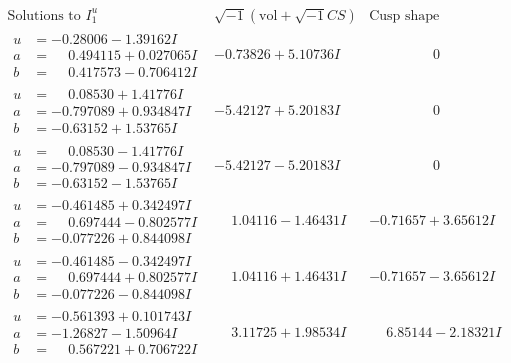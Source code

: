 \documentclass[1p]{elsarticle_modified}
\theoremstyle{definition}
\newcommand{\I}{\sqrt{-1}}
\begin{document}
$$\begin{array}{c|c|c}
 \end{array}$$\newpage$$\begin{array}{c|c|c}  
\text{Solutions to }I^u_{1}& \I (\text{vol} + \sqrt{-1}CS) & \text{Cusp shape}\\
 \hline 
\begin{aligned}
u &= -0.28006 - 1.39162 I \\
a &= \phantom{-}0.494115 + 0.027065 I \\
b &= \phantom{-}0.417573 - 0.706412 I\end{aligned}
 & -0.73826 + 5.10736 I & \phantom{-0.000000 } 0 \\ \hline\begin{aligned}
u &= \phantom{-}0.08530 + 1.41776 I \\
a &= -0.797089 + 0.934847 I \\
b &= -0.63152 + 1.53765 I\end{aligned}
 & -5.42127 + 5.20183 I & \phantom{-0.000000 } 0 \\ \hline\begin{aligned}
u &= \phantom{-}0.08530 - 1.41776 I \\
a &= -0.797089 - 0.934847 I \\
b &= -0.63152 - 1.53765 I\end{aligned}
 & -5.42127 - 5.20183 I & \phantom{-0.000000 } 0 \\ \hline\begin{aligned}
u &= -0.461485 + 0.342497 I \\
a &= \phantom{-}0.697444 - 0.802577 I \\
b &= -0.077226 + 0.844098 I\end{aligned}
 & \phantom{-}1.04116 - 1.46431 I & -0.71657 + 3.65612 I \\ \hline\begin{aligned}
u &= -0.461485 - 0.342497 I \\
a &= \phantom{-}0.697444 + 0.802577 I \\
b &= -0.077226 - 0.844098 I\end{aligned}
 & \phantom{-}1.04116 + 1.46431 I & -0.71657 - 3.65612 I \\ \hline\begin{aligned}
u &= -0.561393 + 0.101743 I \\
a &= -1.26827 - 1.50964 I \\
b &= \phantom{-}0.567221 + 0.706722 I\end{aligned}
 & \phantom{-}3.11725 + 1.98534 I & \phantom{-}6.85144 - 2.18321 I \\ \hline\begin{aligned}

\end{aligned}
\end{array}$$
\end{document}

